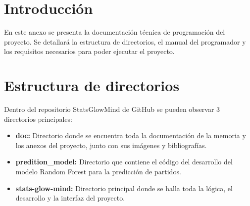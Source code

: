 
\section{Introducción}

En este anexo se presenta la documentación técnica de programación del proyecto. Se detallará la estructura de directorios, el manual del programador y los requisitos necesarios para poder ejecutar el proyecto.

\section{Estructura de directorios}

Dentro del repositorio StatsGlowMind de GitHub \cite{github} se pueden observar 3 directorios principales:

\begin{itemize}
\tightlist
    \item
        \textbf{doc:} Directorio donde se encuentra toda la documentación de la memoria y los anexos del proyecto, junto con sus imágenes y bibliografías.
    \item 
        \textbf{predition\_model:} Directorio que contiene el código del desarrollo del modelo Random Forest para la predicción de partidos.
    \item
        \textbf{stats-glow-mind:} Directorio principal donde se halla toda la lógica, el desarrollo y la interfaz del proyecto.
\end{itemize}

